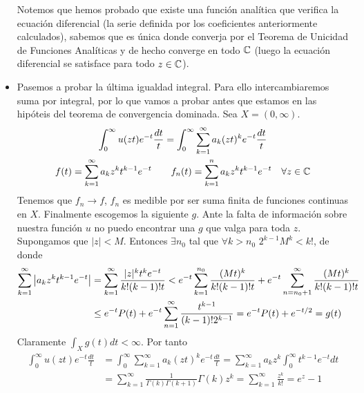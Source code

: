 \documentclass[twoside]{article}
\begin{document}
\begin{ejercicio}{6}
\begin{solucion}
\begin{itemize}
Notemos que hemos probado que existe una función analítica que verifica la ecuación diferencial (la serie definida por los coeficientes anteriormente calculados), sabemos que es única donde converja por el Teorema de Unicidad de Funciones Analíticas y de hecho converge en todo $\mathbb{C}$ (luego la ecuación diferencial se satisface para todo $z\in \mathbb{C}$). 
\item Pasemos a probar la última igualdad integral. Para ello intercambiaremos suma por integral, por lo que vamos a probar antes que estamos en las hipóteis del teorema de convergencia dominada. Sea $X=(0,\infty)$.
\begin{gather*}
\int_0^\infty u(zt)e^{-t}\frac{dt}{t} = \int_0^\infty \sum_{k=1}^\infty a_k (zt)^k e^{-t}\frac{dt}{t}\\
f(t)=\sum_{k=1}^\infty a_kz^kt^{k-1}e^{-t}  \qquad f_n(t) = \sum_{k=1}^n a_kz^kt^{k-1}e^{-t} \quad \forall z\in \mathbb{C}
\end{gather*}
Tenemos que $f_n \to f$, $f_n$ es medible por ser suma finita de funciones continuas en $X$. Finalmente escogemos la siguiente $g$. Ante la falta de información sobre nuestra función $u$ no puedo encontrar una $g$ que valga para toda $z$. Supongamos que $|z|<M$. Entonces $\exists n_0$ tal que $\forall k>n_0$ $2^{k-1} M^k<k!$, de donde
\begin{align*}
\sum_{k=1}^\infty \left\lvert a_kz^kt^{k-1}e^{-t}\right\rvert &= \sum_{k=1}^\infty  \frac{|z|^kt^{k}e^{-t}}{k!(k-1)!t} < e^{-t}\sum_{k=1}^{n_0} \frac{(Mt)^k}{k!(k-1)!t} + e^{-t}\sum_{n=n_0+1}^\infty \frac{(Mt)^k}{k!(k-1)!t}\\
&\leq e^{-t}P(t) + e^{-t}\sum_{n=1}^\infty \frac{t^{k-1}}{(k-1)!2^{k-1}} = e^{-t}P(t)+e^{-t/2} =g(t)
\end{align*}
Claramente $\int_X g(t)dt < \infty$. Por tanto
\begin{align*}
\int_0^\infty u(zt)e^{-t}\frac{dt}{t} & = \int_0^\infty \sum_{k=1}^\infty a_k (zt)^k e^{-t}\frac{dt}{t}= \sum_{k=1}^\infty a_k z^k  \int_0^\infty t^{k-1}e^{-t}dt\\
&= \sum_{k=1}^\infty \frac{1}{\Gamma(k)\Gamma(k+1)} \Gamma(k) z^k =  \sum_{k=1}^\infty \frac{z^k}{k!} = e^z -1
\end{align*}
\end{itemize}
\end{solucion}
\end{ejercicio}
\end{document}
